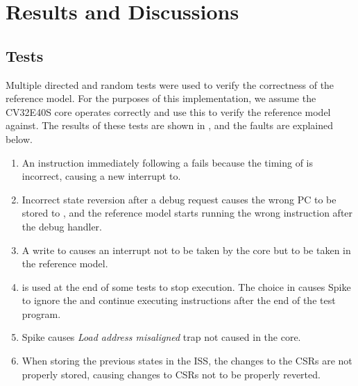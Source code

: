\chapter{Results and Discussions}
\label{ch:results}
 


\section{Tests}
\label{sec:res_tests}

Multiple directed and random tests were used to verify the correctness of the reference model. For the purposes of this implementation, we assume the CV32E40S core operates correctly and use this to verify the reference model against. The results of these tests are shown in , and the faults are explained below. 
\begin{enumerate}[label=Fault \arabic*]
    \item An  instruction immediately following a  fails because the timing of  is incorrect, causing a new interrupt to. \label{fault:mretdret}
    \item Incorrect state reversion after a debug request causes the wrong PC to be stored to , and the reference model starts running the wrong instruction after the debug handler.\label{fault:revert}
    \item A write to  causes an interrupt not to be taken by the core but to be taken in the reference model. \label{fault:mstatus_write}
    \item {} is used at the end of some tests to stop execution. The choice in  causes Spike to ignore the  and continue executing instructions after the end of the test program. \label{fault:wfi}
    \item\label{fault:trap} Spike causes \textit{Load address misaligned} trap not caused in the core.
    \item\label{fault:revert_csr} When storing the previous states in the ISS, the changes to the CSRs are not properly stored, causing changes to CSRs not to be properly reverted.
\end{enumerate}


